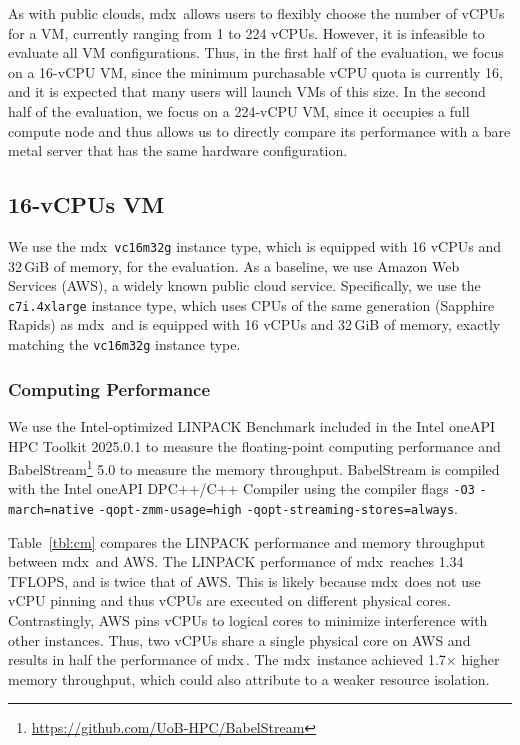 \documentclass[a4paper,twoside]{article}
\newcommand{\mdx}{mdx\,\uppercase\expandafter{\romannumeral 2\relax}}
\begin{document}
As with public clouds, \mdx{} allows users to flexibly choose the number of vCPUs for a VM,
currently ranging from 1 to 224 vCPUs. However, it is infeasible to evaluate all VM
configurations. Thus, in the first half of the evaluation, we focus on a 16-vCPU VM, since the
minimum purchasable vCPU quota is currently 16, and it is expected that many users will launch VMs
of this size. In the second half of the evaluation, we focus on a 224-vCPU VM, since it
occupies a full compute node and thus allows us to directly compare its performance with a bare metal
server that has the same hardware configuration.

\subsection{16-vCPUs VM}

We use the \mdx{} \verb|vc16m32g| instance type, which is equipped with 16 vCPUs and 32\,GiB of
memory, for the evaluation. As a baseline, we use Amazon Web Services (AWS), a widely known public
cloud service. Specifically, we use the \verb|c7i.4xlarge| instance type, which uses CPUs of the
same generation (Sapphire Rapids) as \mdx{} and is equipped with 16 vCPUs and 32\,GiB of memory,
exactly matching the \verb|vc16m32g| instance type. 

\subsubsection{Computing Performance}\label{sec:16vcpu-comp}

We use the Intel-optimized LINPACK Benchmark included in the Intel oneAPI HPC Toolkit 2025.0.1 to
measure the floating-point computing performance and
BabelStream\footnote{\url{https://github.com/UoB-HPC/BabelStream}} 5.0 to measure the memory
throughput. BabelStream is compiled with the Intel oneAPI DPC++/C++ Compiler using the compiler
flags \verb|-O3| \verb|-march=native| \verb|-qopt-zmm-usage=high|
\verb|-qopt-streaming-stores=always|.

Table~\ref{tbl:cm} compares the LINPACK performance and memory throughput between \mdx{} and AWS.
The LINPACK performance of \mdx{} reaches 1.34\,TFLOPS, and is twice that of AWS. This is likely
because \mdx{} does not use vCPU pinning and thus vCPUs are executed on different physical cores.
Contrastingly, AWS pins vCPUs to logical cores to minimize interference with other instances.
Thus, two vCPUs share a single physical core on AWS and results in half the performance of \mdx{}.
The \mdx{} instance achieved 1.7$\times$ higher memory throughput, which could also attribute to a
weaker resource isolation.
\end{document}
